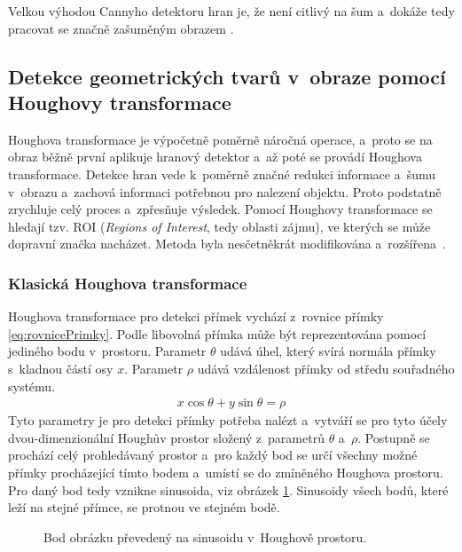 Velkou výhodou Cannyho detektoru hran je, že není citlivý na šum a~dokáže tedy pracovat se značně zašuměným obrazem \cite{tsDetekceTapuska}.


\subsection*{Detekce geometrických tvarů v~obraze pomocí Houghovy transformace}
\label{zpusobyDetekceHough}
Houghova transformace je výpočetně poměrně náročná operace, a~proto se na obraz běžně první aplikuje hranový detektor a~až poté se provádí Houghova transformace. Detekce hran vede k~poměrně značné redukci informace a~šumu v~obrazu a~zachová informaci potřebnou pro nalezení objektu. Proto podstatně zrychluje celý proces a~zpřesňuje výsledek. Pomocí Houghovy transformace se hledají tzv. ROI (\emph{Regions of Interest}, tedy oblasti zájmu), ve kterých se může dopravní značka nacházet. Metoda byla nesčetněkrát modifikována a~rozšířena~\cite{houghTransformace, tsDetekceSvoboda}.

\subsubsection{Klasická Houghova transformace}
\label{zpusobyDetekceHoughtKlasicka}
Houghova transformace pro detekci přímek vychází z~rovnice přímky \eqref{eq:rovnicePrimky}. Podle \cite{houghTransformace, tsWindowsPhone} libovolná přímka může být reprezentována pomocí jediného bodu v~prostoru. Parametr $\theta$ udává úhel, který svírá normála přímky s~kladnou částí osy $x$. Parametr $\rho$ udává vzdálenost přímky od středu souřadného systému.
\begin{align}
    \label{eq:rovnicePrimky}
    x \cos{\theta} + y \sin{\theta} = \rho
\end{align}
Tyto parametry je pro detekci přímky potřeba nalézt a~vytváří se pro tyto účely dvou-dimenzionální Houghův prostor složený z~parametrů $\theta$ a~$\rho$. Postupně se prochází celý prohledávaný prostor a~pro každý bod se určí všechny možné přímky procházející tímto bodem a~umístí se do zmíněného Houghova prostoru. Pro daný bod tedy vznikne sinusoida, viz obrázek \ref{fig:hough}. Sinusoidy všech bodů, které leží na stejné přímce, se protnou ve stejném bodě.

\begin{figure}[H]
    \centering
    \caption{Bod obrázku převedený na sinusoidu v~Houghově prostoru.}
    \label{fig:hough}
\end{figure}

